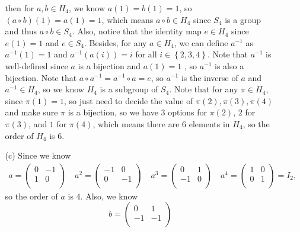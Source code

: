 \documentclass[12pt]{article}
\begin{document}
\begin{enumerate}
\begin{itemize}
        then for \(a, b \in H_4\), we know \(a(1) = b(1) = 1\), so \((a \circ b )(1) = a(1) = 1\), which means \(a \circ b \in H_4\) since \(S_4\) is a group and thus \(a \circ b \in S_4\). Also, notice that the identity map \(e \in H_4\) since \(e(1) = 1\) and \(e \in S_4\). Besides, for any \(a \in H_4\), we can define \(a^{-1}\) as \(a^{-1}(1) = 1\) and \(a^{-1}(a(i)) = i\) for all \(i \in \left\{ 2,3,4 \right\} \). Note that \(a^{-1}\) is well-defined since \(a\) is a bijection and \(a(1) = 1\) , so \(a^{-1}\) is also a bijection. Note that \(a \circ a^{-1} = a^{-1} \circ a = e\), so \(a^{-1}\) is the inverse of \(a\) and \(a^{-1} \in H_4\), so we know \(H_4\) is a subgroup of \(S_4\). Note that for any \(\pi  \in H_4\), since \(\pi (1) = 1\), so just need to decide the value of \(\pi (2), \pi (3), \pi (4)\) and make sure \(\pi \) is a bijection, so we have \(3\) options for \(\pi (2)\), \(2\) for \(\pi (3)\), and \(1\) for \(\pi (4)\), which means there are \(6\) elements in \(H_4\), so the order of \(H_4\) is \(6\).                            
        \item [(c)] Since we know 
        \begin{align*}
            a = \begin{pmatrix}
                0 & -1  \\
                1 &  0 \\
            \end{pmatrix}  \quad
            a^2 = \begin{pmatrix}
                -1 &  0 \\
                0 &  -1 \\
            \end{pmatrix} \quad
            a^3 = \begin{pmatrix}
                0 & 1  \\
                -1 & 0  \\
            \end{pmatrix}  \quad
            a^4 = \begin{pmatrix}
                1 & 0  \\
                0 & 1  \\
            \end{pmatrix} = I_2,
        \end{align*}
        so the order of \(a\) is \(4\). Also, we know 
        \[
            b = \begin{pmatrix}
                0 & 1  \\
                -1 & -1  \\

\end{pmatrix}\]
\end{itemize}
\end{enumerate}
\end{document}
